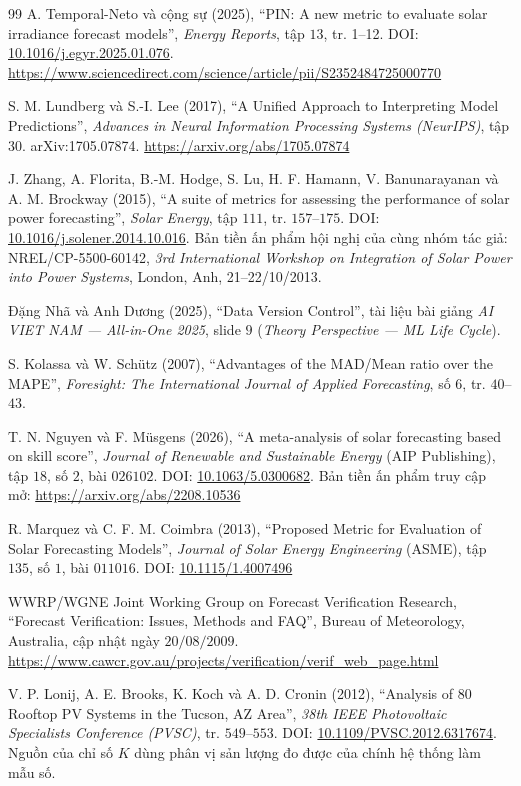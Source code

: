 \begin{thebibliography}{99}
A. Temporal-Neto và cộng sự (2025),
``PIN: A new metric to evaluate solar irradiance forecast models'',
\textit{Energy Reports}, tập $13$, tr. 1--12.
DOI: \href{https://doi.org/10.1016/j.egyr.2025.01.076}{10.1016/j.egyr.2025.01.076}.
\url{https://www.sciencedirect.com/science/article/pii/S2352484725000770}

S. M. Lundberg và S.-I. Lee (2017),
``A Unified Approach to Interpreting Model Predictions'',
\textit{Advances in Neural Information Processing Systems (NeurIPS)}, tập 30.
arXiv:1705.07874. \url{https://arxiv.org/abs/1705.07874}

J. Zhang, A. Florita, B.-M. Hodge, S. Lu, H. F. Hamann, V. Banunarayanan và A. M. Brockway
(2015), ``A suite of metrics for assessing the performance of solar power forecasting'',
\textit{Solar Energy}, tập $111$, tr. $157$--$175$.
DOI: \href{https://doi.org/10.1016/j.solener.2014.10.016}{10.1016/j.solener.2014.10.016}.
Bản tiền ấn phẩm hội nghị của cùng nhóm tác giả: NREL/CP-5500-60142, \textit{3rd International
Workshop on Integration of Solar Power into Power Systems}, London, Anh, 21--22/10/2013.

Đặng Nhã và Anh Dương (2025), ``Data Version Control'',
tài liệu bài giảng \textit{AI VIET NAM --- All-in-One 2025}, slide $9$
(\textit{Theory Perspective --- ML Life Cycle}).

S. Kolassa và W. Schütz (2007),
``Advantages of the MAD/Mean ratio over the MAPE'',
\textit{Foresight: The International Journal of Applied Forecasting}, số $6$, tr. $40$--$43$.

T. N. Nguyen và F. Müsgens (2026),
``A meta-analysis of solar forecasting based on skill score'',
\textit{Journal of Renewable and Sustainable Energy} (AIP Publishing), tập $18$, số $2$,
bài $026102$.
DOI: \href{https://doi.org/10.1063/5.0300682}{10.1063/5.0300682}.
Bản tiền ấn phẩm truy cập mở: \url{https://arxiv.org/abs/2208.10536}

R. Marquez và C. F. M. Coimbra (2013),
``Proposed Metric for Evaluation of Solar Forecasting Models'',
\textit{Journal of Solar Energy Engineering} (ASME), tập $135$, số $1$, bài $011016$.
DOI: \href{https://doi.org/10.1115/1.4007496}{10.1115/1.4007496}

WWRP/WGNE Joint Working Group on Forecast Verification Research,
``Forecast Verification: Issues, Methods and FAQ'', Bureau of Meteorology, Australia,
cập nhật ngày $20/08/2009$.
\url{https://www.cawcr.gov.au/projects/verification/verif_web_page.html}

V. P. Lonij, A. E. Brooks, K. Koch và A. D. Cronin (2012),
``Analysis of 80 Rooftop PV Systems in the Tucson, AZ Area'',
\textit{38th IEEE Photovoltaic Specialists Conference (PVSC)}, tr. $549$--$553$.
DOI: \href{https://doi.org/10.1109/PVSC.2012.6317674}{10.1109/PVSC.2012.6317674}.
Nguồn của chỉ số $K$ dùng phân vị sản lượng đo được của chính hệ thống làm mẫu số.

\end{thebibliography}

